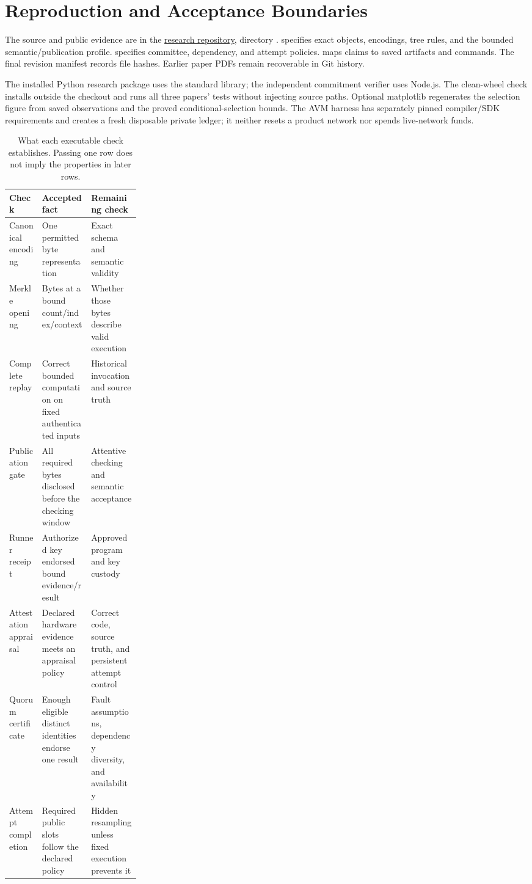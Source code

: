 \section{Reproduction and Acceptance Boundaries}

The source and public evidence are in the \href{https://github.com/qmrkt/research}{research repository}, directory .  specifies exact objects, encodings, tree rules, and the bounded semantic/publication profile.  specifies committee, dependency, and attempt policies.  maps claims to saved artifacts and commands. The final revision manifest records file hashes. Earlier paper PDFs remain recoverable in Git history.

The installed Python research package uses the standard library; the independent commitment verifier uses Node.js. The clean-wheel check installs outside the checkout and runs all three papers' tests without injecting source paths. Optional matplotlib regenerates the selection figure from saved observations and the proved conditional-selection bounds. The AVM harness has separately pinned compiler/SDK requirements and creates a fresh disposable private ledger; it neither resets a product network nor spends live-network funds.

\begin{table}[h]
\centering\small
\caption{What each executable check establishes. Passing one row does not imply the properties in later rows.}
\renewcommand{\arraystretch}{1.12}
\begin{tabularx}{\linewidth}{p{0.25\linewidth}YY}
\toprule
Check & Accepted fact & Remaining check\\
\midrule
Canonical encoding & One permitted byte representation & Exact schema and semantic validity\\
Merkle opening & Bytes at a bound count/index/context & Whether those bytes describe valid execution\\
Complete replay & Correct bounded computation on fixed authenticated inputs & Historical invocation and source truth\\
Publication gate & All required bytes disclosed before the checking window & Attentive checking and semantic acceptance\\
Runner receipt & Authorized key endorsed bound evidence/result & Approved program and key custody\\
Attestation appraisal & Declared hardware evidence meets an appraisal policy & Correct code, source truth, and persistent attempt control\\
Quorum certificate & Enough eligible distinct identities endorse one result & Fault assumptions, dependency diversity, and availability\\
Attempt completion & Required public slots follow the declared policy & Hidden resampling unless fixed execution prevents it\\
\bottomrule
\end{tabularx}
\end{table}

